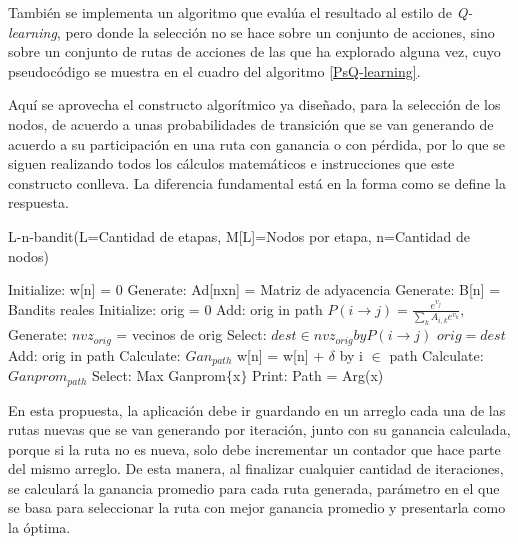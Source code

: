 También se implementa un algoritmo que evalúa el resultado al estilo de \textit{Q-learning}, pero donde la selección no se hace sobre un conjunto de acciones, sino sobre un conjunto de rutas de acciones de las que ha explorado alguna vez, cuyo pseudocódigo se muestra en el cuadro del algoritmo \ref{PsQ-learning}. 

Aquí se aprovecha el constructo algorítmico ya diseñado, para la selección de los nodos, de acuerdo a unas probabilidades de transición que se van generando de acuerdo a su participación en una ruta con ganancia o con pérdida, por lo que se siguen realizando todos los cálculos matemáticos e instrucciones que este constructo conlleva. La diferencia fundamental está en la forma como se define la respuesta.

\vspace{1cm}
\begin{algorithm} []
\caption{L-n-bandit(L=Cantidad de etapas, M[L]=Nodos por etapa, n=Cantidad de nodos)} 
\label{PsQ-learning}
\begin{algorithmic}[1]
\STATE Initialize: w[n] = 0
\STATE Generate: Ad[nxn] = Matriz de adyacencia
\STATE Generate: B[n] = Bandits reales
     \STATE Initialize: orig = 0
     \STATE Add: orig in path
     \STATE $P(i \to j) = \frac{e^{v_j}}{\sum_k A_{i,k} e^{v_k}},$
        \STATE Generate: $nvz_{orig}$ = vecinos de orig
        \STATE Select: ${dest \in nvz_{orig} by P(i \to j)}$
        \STATE $orig = dest$
        \STATE Add: orig in path
     \ENDFOR
     \STATE Calculate: $Gan_{path}$
        \STATE w[n] = w[n] + $\delta$ by i $\in$ path
     \ENDIF   
     \STATE Calculate: $Ganprom_{path}$
\ENDFOR
\STATE Select: Max Ganprom$\{$x$\}$
\STATE Print: Path = Arg(x) 
\end{algorithmic}
\end{algorithm}



En esta propuesta, la aplicación debe ir guardando en un arreglo cada una de las rutas nuevas que se van generando por iteración, junto con su ganancia calculada, porque si la ruta no es nueva, solo debe incrementar un contador que hace parte del mismo arreglo. De esta manera, al finalizar cualquier cantidad de iteraciones, se calculará la ganancia promedio para cada ruta generada, parámetro en el que se basa para seleccionar la ruta con mejor ganancia promedio y presentarla como la óptima.

